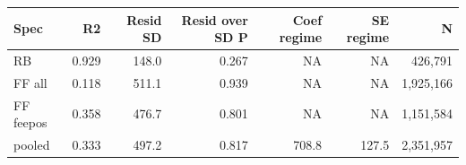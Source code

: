 \begin{tabular}{lrrrrrr}
\toprule
Spec & R2 & Resid SD & Resid over SD P & Coef regime & SE regime & N \\
\midrule
RB & 0.929 & 148.0 & 0.267 & NA & NA &   426,791 \\
FF all & 0.118 & 511.1 & 0.939 & NA & NA & 1,925,166 \\
FF feepos & 0.358 & 476.7 & 0.801 & NA & NA & 1,151,584 \\
pooled & 0.333 & 497.2 & 0.817 & 708.8 & 127.5 & 2,351,957 \\
\bottomrule
\end{tabular}
